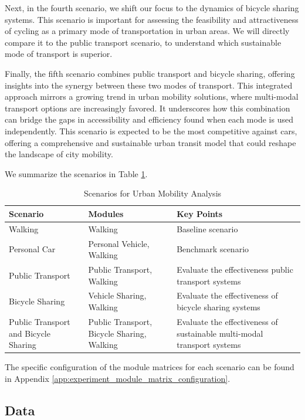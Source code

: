 Next, in the fourth scenario, we shift our focus to the dynamics of bicycle sharing systems. 
This scenario is important for assessing the feasibility and attractiveness of cycling as a primary mode of transportation in urban areas. 
We will directly compare it to the public transport scenario, to understand which sustainable mode of transport is superior.

Finally, the fifth scenario combines public transport and bicycle sharing, offering insights into the synergy between these two modes of transport. 
This integrated approach mirrors a growing trend in urban mobility solutions, where multi-modal transport options are increasingly favored. 
It underscores how this combination can bridge the gaps in accessibility and efficiency found when each mode is used independently. 
This scenario is expected to be the most competitive against cars, offering a comprehensive and sustainable urban transit model that could reshape the landscape of city mobility.

We summarize the scenarios in Table \ref{table:scenarios}.

\begin{table}[h]
\centering
\begin{tabular}{|p{4cm}|p{5cm}|p{4cm}|}
\hline
\textbf{Scenario} & \textbf{Modules} & \textbf{Key Points} \\
\hline
Walking & Walking & Baseline scenario \\
\hline
Personal Car & Personal Vehicle, Walking & Benchmark scenario \\
\hline
Public Transport & Public Transport, Walking & Evaluate the effectiveness public transport systems \\
\hline
Bicycle Sharing & Vehicle Sharing, Walking & Evaluate the effectiveness of bicycle sharing systems \\
\hline
Public Transport and Bicycle Sharing & Public Transport, Bicycle Sharing, Walking & Evaluate the effectiveness of sustainable multi-modal transport systems \\
\hline
\end{tabular}
\caption{Scenarios for Urban Mobility Analysis}
\label{table:scenarios}
\end{table}

The specific configuration of the module matrices for each scenario can be found in Appendix \ref{app:experiment_module_matrix_configuration}.

\subsection{Data}
\label{subs:data}

